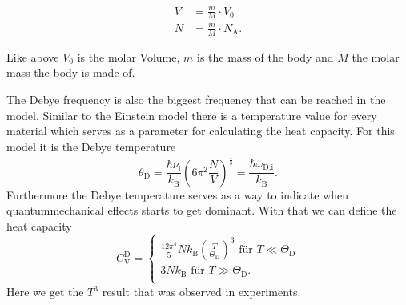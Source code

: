 \begin{align}
    V &= \frac{m}{M} \cdot V_0\\ 
    N &= \frac{m}{M} \cdot N_\text{A}.
\end{align}

Like above $V_0$ is the molar Volume, $m$ is the mass of the body and $M$ the molar mass the body is made of.

The Debye frequency is also the biggest frequency that can be reached in the model.
Similar to the Einstein model there is a temperature value for every material which serves as a parameter for calculating the heat capacity.
For this model it is the Debye temperature
\begin{equation}
    \theta_\text{D} = \frac{\hbar \nu_\text{i}}{k_\text{B}} \left(6 \pi^2 \frac{N}{V} \right)^{\frac{1}{3}} = \frac{\hbar \omega_\text{D,i}}{k_\text{B}}.
    \label{eq:debye_temp}
\end{equation}
Furthermore the Debye temperature serves as a way to indicate when quantummechanical effects starts to get dominant. 
With that we can define the heat capacity
\begin{equation}
    C_\text{V}^\text{D} =
      \begin{cases}
        \frac{12 \pi ^4}{5} N k_\text{B} \left( \frac{T}{\Theta_\text{D}}   \right)^3 \,\, \text{für} \,\,  T \ll \Theta_\text{D}\\
        3 N k_\text{B} \,\, \text{für} \,\, T \gg \Theta_\text{D}.\\
        \end{cases}
        \label{eq:debyec}
\end{equation}
Here we get the $T^3$ result that was observed in experiments.